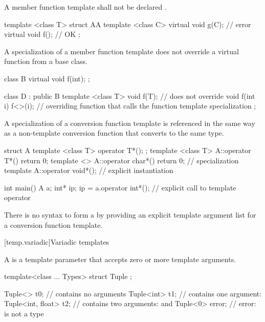 \pnum
A member function template shall not be declared .
\begin{example}
\begin{codeblock}
template <class T> struct AA {
  template <class C> virtual void g(C);             // error
  virtual void f();                                 // OK
};
\end{codeblock}
\end{example}

\pnum
A specialization of
a member function template does not override a virtual function from a
base class.
\begin{example}
\begin{codeblock}
class B {
  virtual void f(int);
};

class D : public B {
  template <class T> void f(T); // does not override 
  void f(int i) { f<>(i); }     // overriding function that calls the function template specialization
};
\end{codeblock}
\end{example}

\pnum
\begin{note}
A specialization of a
conversion function template
is referenced in
the same way as a non-template conversion function that converts to
the same type.
\begin{example}
\begin{codeblock}
struct A {
  template <class T> operator T*();
};
template <class T> A::operator T*() { return 0; }
template <> A::operator char*() { return 0; }       // specialization
template A::operator void*();                       // explicit instantiation

int main() {
  A a;
  int* ip;
  ip = a.operator int*();       // explicit call to template operator 
}
\end{codeblock}
\end{example}
There is no syntax to form a 
by providing an explicit template argument list
for a conversion function template.
\end{note}

[temp.variadic]{Variadic templates}

\pnum
A  is a template parameter
that accepts zero or more template arguments.
\begin{example}
\begin{codeblock}
template<class ... Types> struct Tuple { };

Tuple<> t0;                     //  contains no arguments
Tuple<int> t1;                  //  contains one argument: 
Tuple<int, float> t2;           //  contains two arguments:  and 
Tuple<0> error;                 // error:  is not a type
\end{codeblock}
\end{example}


